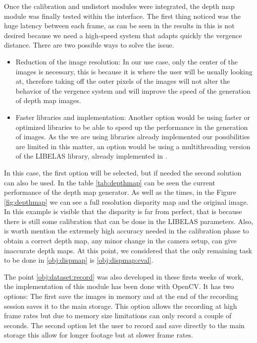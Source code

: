 \documentclass[10pt,a4paper,twocolumn,twoside]{article}
\begin{document}
	Once the calibration and undistort modules were integrated, the depth map module was finally tested within the interface. 
	The first thing noticed was the huge latency between each frame, as can be seen in the results in  this is not desired because we need a high-speed system that adapts quickly the vergence distance. There are two possible ways to solve the issue.
	
	\begin{itemize}
		\item Reduction of the image resolution: In our use case, only the center of the images is necessary, this is because it is where the user will be usually looking at, therefore taking off the outer pixels of the images will not alter the behavior of the vergence system and will improve the speed of the generation of depth map images.
		
		\item Faster libraries and implementation: Another option would be using faster or optimized libraries to be able to speed up the performance in the generation of images. As the we are using libraries already implemented our possibilities are limited in this matter, an option would be using a multithreading version of the LIBELAS library, already implemented in \cite{web:LIBELAS}.
	\end{itemize}
	In this case, the first option will be selected, but if needed the second solution can also be used. In the table \ref{tab:depthmap} can be seen the current performance of the depth map generator. As well as the times, in the Figure \ref{fig:depthmap} we can see a full resolution disparity map and the original image. In this example is visible that the disparity is far from perfect, that is because there is still some calibration that can be done in the LIBELAS parameters. Also, is worth mention the extremely high accuracy needed in the calibration phase to obtain a correct depth map, any minor change in the camera setup, can give inaccurate depth maps.
	At this point, we considered that the only remaining task to be done in \ref{obj:dispmap} is \ref{obj:dispmap:eval}.
	
	The point \ref{obj:dataset:record} was also developed in these firsts weeks of work, the implementation of this module has been done with OpenCV. It has two options:
	The first save the images in memory and at the end of the recording session saves it to the main storage. This option allows the recording at high frame rates but due to memory size limitations can only record a couple of seconds. 
	The second option let the user to record and save directly to the main storage this allow for longer footage but at slower frame rates.
	
\end{document}
